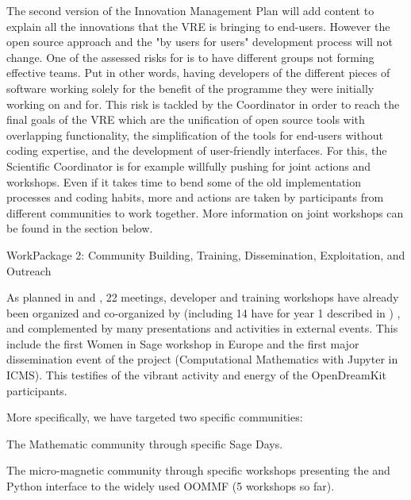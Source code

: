 \documentclass{deliverablereport}
\makeatletter
\renewcommand\subsubsection{\@startsection{subsubsection}{2}%
  \z@{.5\linespacing\@plus.7\linespacing}{.1\linespacing}%
  {\normalfont\bfseries}}
\makeatother
\begin{document}
  The second version of the Innovation Management Plan will add content to explain all the
  innovations that the VRE is bringing to end-users. However the open source approach and
  the "by users for users" development process will not change.  One
  of the assessed risks for \ODK is to have different groups not forming effective teams. Put
  in other words, having developers of the different pieces of software working solely for
  the benefit of the programme they were initially working on and for. This risk is
  tackled by the Coordinator in order to reach the final goals of the VRE which are the
  unification of open source tools with overlapping functionality, the simplification of
  the tools for end-users without coding expertise, and the development of user-friendly
  interfaces. For this, the Scientific Coordinator is for example willfully pushing
  for joint actions and
  workshops. Even if it takes time to bend some of the old implementation processes and coding habits,
  more and actions are taken by \ODK participants from different communities to work
  together. More information on joint workshops can be found in the section below.

\clearpage
  \subsubsection{WorkPackage 2:  Community Building, Training, Dissemination, Exploitation, and Outreach}
\label{wp2}

  As planned in  and
  , 22 meetings, developer and training workshops have already
  been organized and co-organized by \ODK (including 14 have for year 1 described in ) , and complemented by many
  presentations and activities in external events. This include the first Women in Sage workshop in Europe and the
  first major dissemination event of the project (Computational Mathematics with Jupyter in ICMS). This testifies
  of the vibrant activity and energy of the OpenDreamKit participants.
  
  More specifically, we have targeted two specific communities:

\begin{compactitem}
\item The Mathematic community through specific Sage Days.
\item The micro-magnetic community through specific workshops presenting
the \Jupyter and Python interface to the widely used OOMMF  (5 workshops so far).
\end{compactitem}  
  
\end{document}
